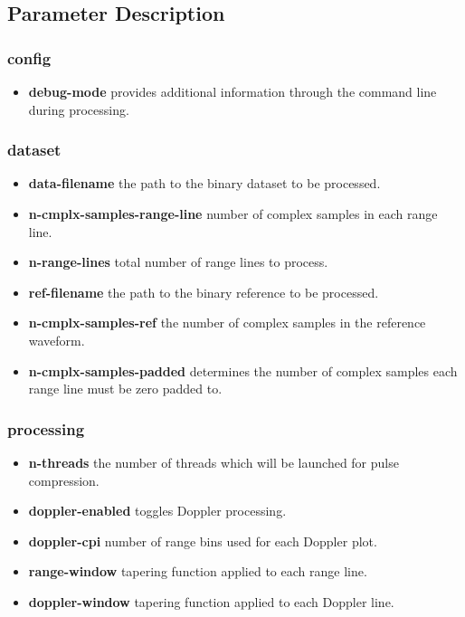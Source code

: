 \documentclass[a4paper,11pt]{report}
\begin{document}
\subsection{Parameter Description}
\subsubsection{config}
\begin{itemize}
  \item \textbf{debug-mode} provides additional information through the command line during processing.
\end{itemize}
\subsubsection{dataset}
\begin{itemize}
  \item \textbf{data-filename} the path to the binary dataset to be processed. 
  \item \textbf{n-cmplx-samples-range-line} number of complex samples in each range line.
  \item \textbf{n-range-lines} total number of range lines to process.
  \item \textbf{ref-filename} the path to the binary reference to be processed. 
  \item \textbf{n-cmplx-samples-ref} the number of complex samples in the reference waveform.
  \item \textbf{n-cmplx-samples-padded} determines the number of complex samples each range line must be zero padded to.
\end{itemize}
\subsubsection{processing}
\begin{itemize}
  \item \textbf{n-threads} the number of threads which will be launched for pulse compression.
  \item \textbf{doppler-enabled} toggles Doppler processing.
  \item \textbf{doppler-cpi} number of range bins used for each Doppler plot.
  \item \textbf{range-window} tapering function applied to each range line. 
  \item \textbf{doppler-window} tapering function applied to each Doppler line.
\end{itemize}
\end{document}
